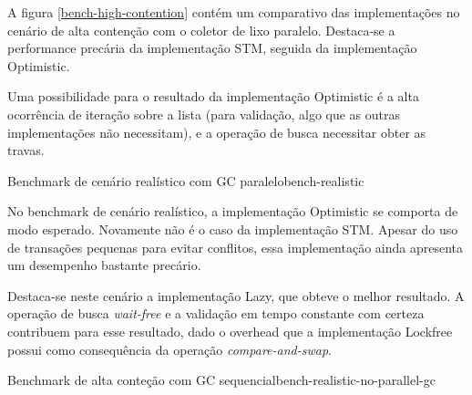\documentclass[a4paper,12pt,oldfontcommands]{abntex2}
\begin{document}
A figura \ref{bench-high-contention} contém um comparativo das implementações no cenário de alta contenção com o coletor de lixo paralelo. Destaca-se a performance precária da implementação STM, seguida da implementação Optimistic.

Uma possibilidade para o resultado da implementação Optimistic é a alta ocorrência de iteração sobre a lista (para validação, algo que as outras implementações não necessitam), e a operação de busca necessitar obter as travas.

\begin{center}
\begin{graph}{Benchmark de cenário realístico com GC paralelo}{bench-realistic}
\begin{bchart}[step=3,max=30,unit=s,width=.9\textwidth]
        \smallskip
        \smallskip
        \smallskip
        \smallskip
        \smallskip
\end{bchart}
\end{graph}
\end{center}

No benchmark de cenário realístico, a implementação Optimistic se comporta de modo esperado. Novamente não é o caso da implementação STM. Apesar do uso de transações pequenas para evitar conflitos, essa implementação ainda apresenta um desempenho bastante precário.

Destaca-se neste cenário a implementação Lazy, que obteve o melhor resultado. A operação de busca \textit{wait-free} e a validação em tempo constante com certeza contribuem para esse resultado, dado o overhead que a implementação Lockfree possui como consequência da operação \textit{compare-and-swap}.

\begin{center}
\begin{graph}{Benchmark de alta conteção com GC sequencial}{bench-realistic-no-parallel-gc}
\begin{bchart}[step=3,max=12,unit=s,width=.9\textwidth]
        \smallskip
        \smallskip
        \smallskip
        \smallskip
        \smallskip
\end{bchart}
\end{graph}
\end{center}
\end{document}
